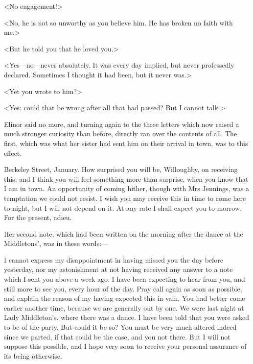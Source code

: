 <No engagement!>

<No, he is not so unworthy as you believe him. He has broken no faith with me.>

<But he told you that he loved you.>

<Yes—no—never absolutely. It was every day implied, but never professedly declared. Sometimes I thought it had been, but it never was.>

<Yet you wrote to him?>

<Yes: could that be wrong after all that had passed? But I cannot talk.>

Elinor said no more, and turning again to the three letters which now raised a much stronger curiosity than before, directly ran over the contents of all. The first, which was what her sister had sent him on their arrival in town, was to this effect.

\begin{mail}{Berkeley Street, January.}{}
How surprised you will be, Willoughby, on receiving this; and I think you will feel something more than surprise, when you know that I am in town. An opportunity of coming hither, though with Mrs Jennings, was a temptation we could not resist. I wish you may receive this in time to come here to-night, but I will not depend on it. At any rate I shall expect you to-morrow. For the present, adieu.

\end{mail}

Her second note, which had been written on the morning after the dance at the Middletons', was in these words:—

\begin{mail}{}{}
I cannot express my disappointment in having missed you the day before yesterday, nor my astonishment at not having received any answer to a note which I sent you above a week ago. I have been expecting to hear from you, and still more to see you, every hour of the day. Pray call again as soon as possible, and explain the reason of my having expected this in vain. You had better come earlier another time, because we are generally out by one. We were last night at Lady Middleton's, where there was a dance. I have been told that you were asked to be of the party. But could it be so? You must be very much altered indeed since we parted, if that could be the case, and you not there. But I will not suppose this possible, and I hope very soon to receive your personal assurance of its being otherwise.

\end{mail}

